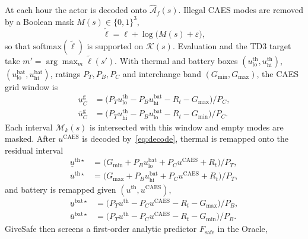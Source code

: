 \documentclass[conference]{IEEEtran}
\newcommand{\Afhat}{\widehat{\mathcal{A}}_{f}}
\begin{document}
At each hour the actor is decoded onto \(\Afhat(s)\). Illegal CAES modes are removed by a Boolean mask \(M(s)\in\{0,1\}^3\),
\begin{equation}
\tilde\ell
=
\ell + \log\bigl(M(s)+\varepsilon\bigr),
\label{eq:mask}
\end{equation}
so that \(\mathrm{softmax}(\tilde\ell)\) is supported on \(\mathcal{K}(s)\). Evaluation and the TD3 target take \(m'=\arg\max_m\tilde\ell(s')\). With thermal and battery boxes \((u^{\mathrm{th}}_{\mathrm{lo}},u^{\mathrm{th}}_{\mathrm{hi}})\), \((u^{\mathrm{bat}}_{\mathrm{lo}},u^{\mathrm{bat}}_{\mathrm{hi}})\), ratings \(P_T,P_B,P_C\) and interchange band \((G_{\min},G_{\max})\), the CAES grid window is
\begin{equation}
\begin{aligned}
\underline{u}_C^{\mathrm{g}}
&=
\bigl(P_T u^{\mathrm{th}}_{\mathrm{lo}}-P_B u^{\mathrm{bat}}_{\mathrm{hi}}-R_t-G_{\max}\bigr)/P_C,\\
\overline{u}_C^{\mathrm{g}}
&=
\bigl(P_T u^{\mathrm{th}}_{\mathrm{hi}}-P_B u^{\mathrm{bat}}_{\mathrm{lo}}-R_t-G_{\min}\bigr)/P_C.
\end{aligned}
\label{eq:caes-window}
\end{equation}
Each interval \(\mathcal{M}_k(s)\) is intersected with this window and empty modes are masked. After \(u^{\mathrm{CAES}}\) is decoded by~\eqref{eq:decode}, thermal is remapped onto the residual interval
\begin{equation}
\begin{aligned}
\underline{u}^{\mathrm{th}\star}
&=
\bigl(G_{\min}+P_B u^{\mathrm{bat}}_{\mathrm{lo}}+P_C u^{\mathrm{CAES}}+R_t\bigr)/P_T,\\
\overline{u}^{\mathrm{th}\star}
&=
\bigl(G_{\max}+P_B u^{\mathrm{bat}}_{\mathrm{hi}}+P_C u^{\mathrm{CAES}}+R_t\bigr)/P_T,
\end{aligned}
\label{eq:th-window}
\end{equation}
and battery is remapped given \((u^{\mathrm{th}},u^{\mathrm{CAES}})\),
\begin{equation}
\begin{aligned}
\underline{u}^{\mathrm{bat}\star}
&=
\bigl(P_T u^{\mathrm{th}}-P_C u^{\mathrm{CAES}}-R_t-G_{\max}\bigr)/P_B,\\
\overline{u}^{\mathrm{bat}\star}
&=
\bigl(P_T u^{\mathrm{th}}-P_C u^{\mathrm{CAES}}-R_t-G_{\min}\bigr)/P_B.
\end{aligned}
\label{eq:bat-window}
\end{equation}
GiveSafe then screens a first-order analytic predictor \(F_{\mathrm{safe}}\) in the Oracle,
\end{document}
